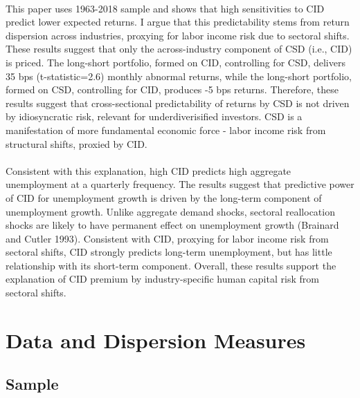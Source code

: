 \documentclass[12pt]{article}
\begin{document}
\paragraph{}
This paper uses 1963-2018 sample and shows that high sensitivities to CID predict lower expected returns. I argue that this predictability stems from return dispersion across industries, proxying for labor income risk due to sectoral shifts. These results suggest that only the across-industry component of CSD (i.e., CID) is priced. The long-short portfolio, formed on CID, controlling for CSD, delivers 35 bps (t-statistic=2.6) monthly abnormal returns, while the long-short portfolio, formed on CSD, controlling for CID, produces -5 bps returns. Therefore, these results suggest that cross-sectional predictability of returns by CSD is not driven by idiosyncratic risk, relevant for underdiverisified investors. CSD is a manifestation of more fundamental economic force - labor income risk from structural shifts, proxied by CID. 
\paragraph{}
Consistent with this explanation, high CID predicts high aggregate unemployment at a quarterly frequency. The results suggest that predictive power of CID for unemployment growth is driven by the long-term component of unemployment growth. Unlike aggregate demand shocks, sectoral reallocation shocks are likely to have permanent effect on unemployment growth (Brainard and Cutler 1993). Consistent with CID, proxying for labor income risk from sectoral shifts, CID strongly predicts long-term unemployment, but has little relationship with its short-term component.  Overall, these results support the explanation of CID premium by industry-specific human capital risk from sectoral shifts.



\section{Data and Dispersion Measures} \label{sec:Model}

\subsection{Sample}
\end{document}
